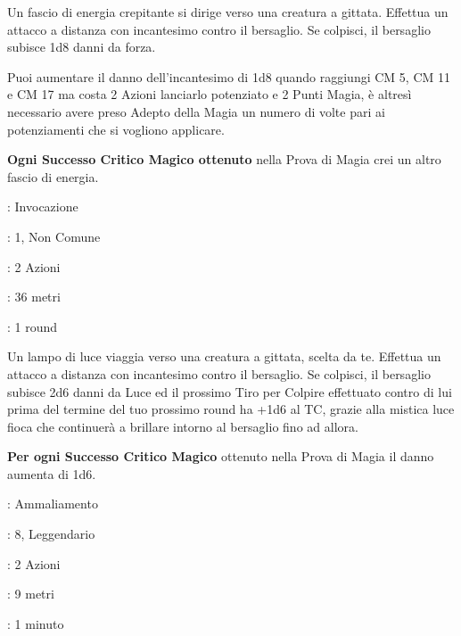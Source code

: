 \begin{multicols}{2}
Un fascio di energia crepitante si dirige verso una creatura a gittata. Effettua un attacco a distanza con incantesimo contro il bersaglio. Se colpisci, il bersaglio subisce 1d8 danni da forza.

Puoi aumentare il danno dell'incantesimo di 1d8 quando raggiungi CM 5, CM 11 e CM 17 ma costa 2 Azioni lanciarlo potenziato e 2 Punti Magia, è altresì necessario avere preso Adepto della Magia un numero di volte pari ai potenziamenti che si vogliono applicare.

\textbf{Ogni Successo Critico Magico ottenuto} nella Prova di Magia crei un altro fascio di energia.

\noindent\colorbox{OBSSgold!10}{
\begin{minipage}{0.95\linewidth}
\begin{description}[noitemsep, topsep=0pt, parsep=0pt, partopsep=0pt, leftmargin=0cm, labelwidth=1.3cm]
	\item[\textbf{Lista}]: Invocazione
	\item[\textbf{Livello}]: 1, Non Comune
	\item[\textbf{Lancio}]: 2 Azioni
	\item[\textbf{Gittata}]: 36 metri
	\item[\textbf{Durata}]: 1 round
\end{description}
\end{minipage}}\smallskip

Un lampo di luce viaggia verso una creatura a gittata, scelta da te. Effettua un attacco a distanza con incantesimo contro il bersaglio. Se colpisci, il bersaglio subisce 2d6 danni da Luce ed il prossimo Tiro per Colpire effettuato contro di lui prima del termine del tuo prossimo round ha +1d6 al TC, grazie alla mistica luce fioca che continuerà a brillare intorno al bersaglio fino ad allora.

\textbf{Per ogni Successo Critico Magico} ottenuto nella Prova di Magia il danno aumenta di 1d6.

\noindent\colorbox{OBSSgold!10}{
\begin{minipage}{0.95\linewidth}
\begin{description}[noitemsep, topsep=0pt, parsep=0pt, partopsep=0pt, leftmargin=0cm, labelwidth=1.3cm]
	\item[\textbf{Lista}]: Ammaliamento
	\item[\textbf{Livello}]: 8, Leggendario
	\item[\textbf{Lancio}]: 2 Azioni
	\item[\textbf{Gittata}]: 9 metri
	\item[\textbf{Durata}]: 1 minuto
\end{description}
\end{minipage}}\smallskip


\end{multicols}

